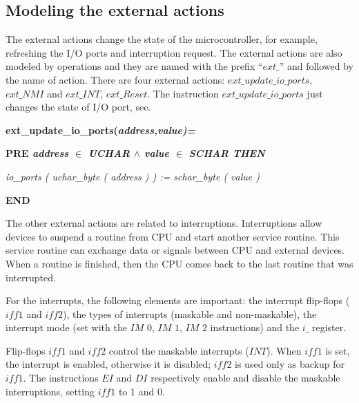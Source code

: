 \documentclass[a4paper]{llncs}
\begin{document}
\subsection{Modeling the external actions}
\label{sec:externalactions}

The external actions change the state of the microcontroller, for example, refreshing the I/O ports
and interruption request. The external actions are also modeled by operations and they are named with the
prefix ``$ext\_$'' and followed by the name of action. There are four external
actions: $ext\_update\_io\_ports$, $ext\_NMI$ and $ext\_INT$, $ext\_Reset$. The instruction
$ext\_update\_io\_ports$ just changes the state of I/O port, see.

\hspace*{0.20in}\bf ext\_update\_io\_ports\rm (\it address\rm ,\it value\rm )\rm =

\hspace*{0.20in}\bf PRE \it address  $\in$  \it UCHAR  $\land$ \hspace*{0.10in}\it value  $\in$  \it SCHAR \bf THEN

\hspace*{0.40in}\it io\_ports \rm ( \it uchar\_byte \rm ( \it address \rm ) \rm ) \rm := \it schar\_byte \rm ( \it
value \rm )

\hspace*{0.20in}\bf END\rm 

The other external actions are related to interruptions. Interruptions allow
devices to suspend a routine from CPU and start another service routine.
This service routine can exchange data or signals between CPU and external
devices. When a routine is finished, then the CPU comes back to the last routine
that was interrupted.

For the interrupts, the following elements are important:  the interrupt flip-flops
($\textit{iff1}$ and $\textit{iff2}$), the types of interrupts (maskable and
non-maskable), the interrupt mode (set with the $\textit{IM 0}$, $\textit{IM 1}$,
$\textit{IM 2}$ instructions) and the $\textit{i\_}$ register.

Flip-flops $\textit{iff1}$ and $\textit{iff2}$ control the maskable interrupts
($\textit{INT}$). When $\textit{iff1}$ is set, the interrupt is enabled,
otherwise it is disabled; $\textit{iff2}$ is used only as backup for $\textit{iff1}$. The
instructions $\textit{EI}$ and $\textit{DI}$ respectively enable and disable the
maskable interruptions, setting  $\textit{iff1}$ to 1 and 0.
\end{document}
